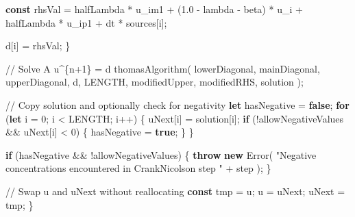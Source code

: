 \documentclass[
  letterpaper,
  DIV=11,
  numbers=noendperiod]{scrreprt}
\newenvironment{Shaded}{\begin{snugshade}}{\end{snugshade}}
\newcommand{\BuiltInTok}[1]{\textcolor[rgb]{0.00,0.23,0.31}{#1}}
\newcommand{\CommentTok}[1]{\textcolor[rgb]{0.37,0.37,0.37}{#1}}
\newcommand{\ControlFlowTok}[1]{\textcolor[rgb]{0.00,0.23,0.31}{\textbf{#1}}}
\newcommand{\DecValTok}[1]{\textcolor[rgb]{0.68,0.00,0.00}{#1}}
\newcommand{\FloatTok}[1]{\textcolor[rgb]{0.68,0.00,0.00}{#1}}
\newcommand{\FunctionTok}[1]{\textcolor[rgb]{0.28,0.35,0.67}{#1}}
\newcommand{\KeywordTok}[1]{\textcolor[rgb]{0.00,0.23,0.31}{\textbf{#1}}}
\newcommand{\NormalTok}[1]{\textcolor[rgb]{0.00,0.23,0.31}{#1}}
\newcommand{\OperatorTok}[1]{\textcolor[rgb]{0.37,0.37,0.37}{#1}}
\newcommand{\StringTok}[1]{\textcolor[rgb]{0.13,0.47,0.30}{#1}}
\begin{document}
\begin{Shaded}
\begin{Highlighting}[]
            \KeywordTok{const}\NormalTok{ rhsVal }\OperatorTok{=}
\NormalTok{                halfLambda }\OperatorTok{*}\NormalTok{ u\_im1 }\OperatorTok{+}
\NormalTok{                (}\FloatTok{1.0} \OperatorTok{{-}}\NormalTok{ lambda }\OperatorTok{{-}}\NormalTok{ beta) }\OperatorTok{*}\NormalTok{ u\_i }\OperatorTok{+}
\NormalTok{                halfLambda }\OperatorTok{*}\NormalTok{ u\_ip1 }\OperatorTok{+}
\NormalTok{                dt }\OperatorTok{*}\NormalTok{ sources[i]}\OperatorTok{;}

\NormalTok{            d[i] }\OperatorTok{=}\NormalTok{ rhsVal}\OperatorTok{;}
\NormalTok{        \}}

        \CommentTok{// Solve A u\^{}\{n+1\} = d}
        \FunctionTok{thomasAlgorithm}\NormalTok{(}
\NormalTok{            lowerDiagonal}\OperatorTok{,}
\NormalTok{            mainDiagonal}\OperatorTok{,}
\NormalTok{            upperDiagonal}\OperatorTok{,}
\NormalTok{            d}\OperatorTok{,}
\NormalTok{            LENGTH}\OperatorTok{,}
\NormalTok{            modifiedUpper}\OperatorTok{,}
\NormalTok{            modifiedRHS}\OperatorTok{,}
\NormalTok{            solution}
\NormalTok{        )}\OperatorTok{;}

        \CommentTok{// Copy solution and optionally check for negativity}
        \KeywordTok{let}\NormalTok{ hasNegative }\OperatorTok{=} \KeywordTok{false}\OperatorTok{;}
        \ControlFlowTok{for}\NormalTok{ (}\KeywordTok{let}\NormalTok{ i }\OperatorTok{=} \DecValTok{0}\OperatorTok{;}\NormalTok{ i }\OperatorTok{\textless{}}\NormalTok{ LENGTH}\OperatorTok{;}\NormalTok{ i}\OperatorTok{++}\NormalTok{) \{}
\NormalTok{            uNext[i] }\OperatorTok{=}\NormalTok{ solution[i]}\OperatorTok{;}
            \ControlFlowTok{if}\NormalTok{ (}\OperatorTok{!}\NormalTok{allowNegativeValues }\OperatorTok{\&\&}\NormalTok{ uNext[i] }\OperatorTok{\textless{}} \DecValTok{0}\NormalTok{) \{}
\NormalTok{                hasNegative }\OperatorTok{=} \KeywordTok{true}\OperatorTok{;}
\NormalTok{            \}}
\NormalTok{        \}}

        \ControlFlowTok{if}\NormalTok{ (hasNegative }\OperatorTok{\&\&} \OperatorTok{!}\NormalTok{allowNegativeValues) \{}
            \ControlFlowTok{throw} \KeywordTok{new} \BuiltInTok{Error}\NormalTok{(}
                \StringTok{"Negative concentrations encountered in CrankNicolson step "} \OperatorTok{+}\NormalTok{ step}
\NormalTok{            )}\OperatorTok{;}
\NormalTok{        \}}

        \CommentTok{// Swap u and uNext without reallocating}
        \KeywordTok{const}\NormalTok{ tmp }\OperatorTok{=}\NormalTok{ u}\OperatorTok{;}
\NormalTok{        u }\OperatorTok{=}\NormalTok{ uNext}\OperatorTok{;}
\NormalTok{        uNext }\OperatorTok{=}\NormalTok{ tmp}\OperatorTok{;}
\NormalTok{    \}}


\end{Highlighting}
\end{Shaded}
\end{document}
